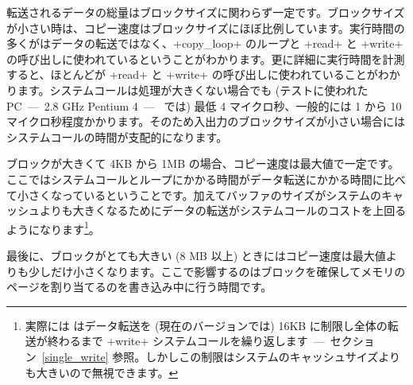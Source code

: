 転送されるデータの総量はブロックサイズに関わらず一定です。ブロックサイズが小さい時は、コピー速度はブロックサイズにほぼ比例しています。実行時間の多くがはデータの転送ではなく、\ml+copy_loop+ のループと \ml+read+ と \ml+write+ の呼び出しに使われているということがわかります。更に詳細に実行時間を計測すると、ほとんどが \ml+read+ と \ml+write+ の呼び出しに使われていることがわかります。システムコールは処理が大きくない場合でも (テストに使われた PC~---~2.8 GHz Pentium 4~---~ では) 最低 4 マイクロ秒、一般的には 1 から 10 マイクロ秒程度かかります。そのため入出力のブロックサイズが小さい場合にはシステムコールの時間が支配的になります。

ブロックが大きくて 4KB から 1MB の場合、コピー速度は最大値で一定です。ここではシステムコールとループにかかる時間がデータ転送にかかる時間に比べて小さくなっているということです。加えてバッファのサイズがシステムのキャッシュよりも大きくなるためにデータの転送がシステムコールのコストを上回るようになります\footnote{実際には \ocaml はデータ転送を (現在のバージョンでは) 16KB に制限し全体の転送が終わるまで \ml+write+ システムコールを繰り返します~---~セクション~\ref{single_write} 参照。しかしこの制限はシステムのキャッシュサイズよりも大きいので無視できます。}。

最後に、ブロックがとても大きい (8 MB 以上) ときにはコピー速度は最大値よりも少しだけ小さくなります。ここで影響するのはブロックを確保してメモリのページを割り当てるのを書き込み中に行う時間です。

